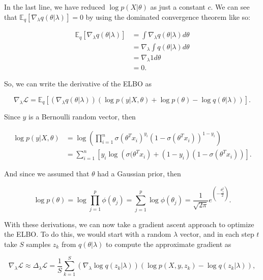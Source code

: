 In the last line, we have reduced $\log p(X | \theta)$ as just a constant $c$. We can see that $\mathbb{E}_q \left[ \nabla_{\lambda} q(\theta | \lambda) \right] = 0$ by using the dominated convergence theorem \cite{ranganath2014black} like so:

\begin{equation*}
  \begin{split}
      \mathbb{E}_q \left[ \nabla_{\lambda} q(\theta | \lambda) \right] &=
      \int \nabla_{\lambda} q(\theta | \lambda) d\theta \\
      &= \nabla_{\lambda} \int q(\theta | \lambda) d\theta \\
      &= \nabla_{\lambda} 1 d\theta \\
      &= 0.
  \end{split}
\end{equation*}

So, we can write the derivative of the ELBO as

$$
  \nabla_{\lambda} \mathcal{L} = \mathbb{E}_q \left[ \left( \nabla_{\lambda} q(\theta | \lambda) \right) \left( \log p(y | X, \theta) + \log p(\theta) - \log q(\theta | \lambda) \right) \right].
$$

Since $y$ is a Bernoulli random vector, then


\begin{equation*}
  \begin{split}
      \log p(y | X, \theta) &=
      \log \left( \prod_{i = 1}^n \sigma(\theta^T x_i)^{y_i} (1 - \sigma(\theta^T x_i))^{1-y_i} \right) \\
      &= \sum_{i = 1}^n \left[ y_i \log \left( \sigma(\theta^T x_i \right) + (1 - y_i) (1 - \sigma(\theta^T x_i)) \right].
  \end{split}
\end{equation*}

And since we assumed that $\theta$ had a Gaussian prior, then

$$
  \log p(\theta) = \log \prod_{j = 1}^p \phi(\theta_j) = \sum_{j = 1}^p \log \phi(\theta_j) = \frac{1}{\sqrt{2 \pi}} e^{\left( -\frac{\theta_j^2}{2} \right)}.
$$

With these derivations, we can now take a gradient ascent approach to optimize the ELBO. To do this, we would start with a random $\lambda$ vector, and in each step $t$ take $S$ samples $z_k$ from $q(\theta | \lambda)$ to compute the approximate gradient as

$$
  \nabla_{\lambda} \mathcal{L} \approx \Delta_{\lambda} \mathcal{L} = \frac{1}{S} \sum_{k = 1}^S \left( \nabla_{\lambda} \log q(z_k | \lambda) \right) \left( \log p(X, y, z_k) - \log q(z_k | \lambda) \right),
$$

